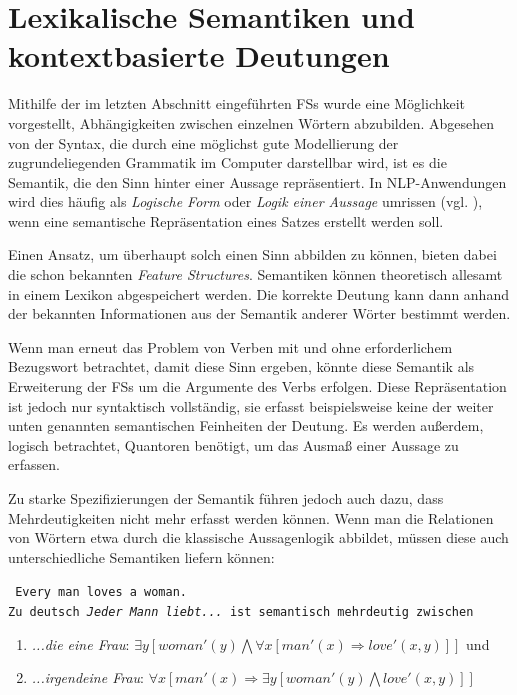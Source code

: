 \documentclass[12pt]{report}
\begin{document}
\section[Lexikalische Semantiken]{Lexikalische Semantiken und \\kontextbasierte Deutungen}
Mithilfe der im letzten Abschnitt eingeführten FSs wurde eine Möglichkeit vorgestellt, Abhängigkeiten zwischen einzelnen Wörtern abzubilden. Abgesehen von der Syntax, die durch eine möglichst gute Modellierung der zugrundeliegenden Grammatik im Computer darstellbar wird, ist es die Semantik, die den \glqq  Sinn\grqq{} hinter einer Aussage repräsentiert. In NLP-Anwendungen wird dies häufig als \textit{\glqq  Logische Form\grqq{}} oder \textit{\glqq  Logik einer Aussage\grqq{}} umrissen (vgl. \cite{swb02}), wenn eine semantische Repräsentation eines Satzes erstellt werden soll. 

Einen Ansatz, um überhaupt solch einen Sinn abbilden zu können, bieten dabei die schon bekannten \textit{Feature Structures}. Semantiken können theoretisch allesamt in einem Lexikon abgespeichert werden. Die korrekte Deutung kann dann anhand der bekannten Informationen aus der Semantik anderer Wörter bestimmt werden. 

Wenn man erneut das Problem von Verben mit und ohne erforderlichem Bezugswort betrachtet, damit diese Sinn ergeben, könnte diese Semantik als Erweiterung der FSs um die Argumente des Verbs erfolgen. Diese Repräsentation ist jedoch nur syntaktisch vollständig, sie erfasst beispielsweise keine der weiter unten genannten semantischen Feinheiten der Deutung. Es werden außerdem, logisch betrachtet, Quantoren benötigt, um das Ausmaß einer Aussage zu erfassen.

Zu starke Spezifizierungen der Semantik führen jedoch auch dazu, dass Mehrdeutigkeiten nicht mehr erfasst werden können. Wenn man die Relationen von Wörtern etwa durch die klassische Aussagenlogik abbildet, müssen diese auch unterschiedliche Semantiken liefern können:

\tt
Every man loves a woman.
\rm
\\
Zu deutsch \textit{\glqq  Jeder Mann liebt...\grqq{}} ist semantisch mehrdeutig zwischen  
\begin{enumerate}
\item \textit{\glqq  ...die eine Frau\grqq{}}: $\exists y [woman'(y) \bigwedge \forall x [man'(x) \Rightarrow love'(x,y)]]$ und
\item \textit{\glqq  ...irgendeine Frau\grqq{}}: $\forall x [man'(x) \Rightarrow \exists y [woman'(y) \bigwedge love'(x,y)]]$
\end{enumerate}
\end{document}

